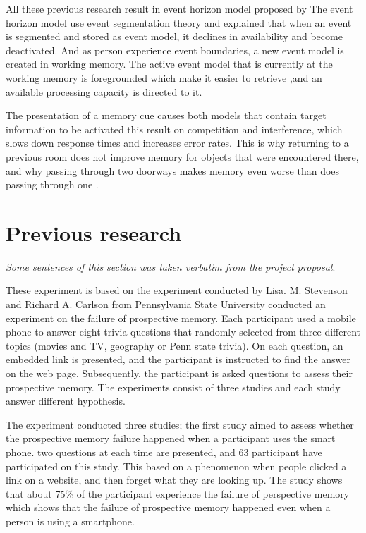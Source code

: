 All these previous research result in event horizon model proposed by \cite{Radvansky2012}
The event horizon model use event segmentation theory and explained that when an event is
segmented and stored as event model, it declines in availability and become deactivated. And
as person experience event boundaries, a new event model is created in working memory. The
active event model that is currently at the working memory is foregrounded which make it easier
to retrieve ,and an available processing capacity is directed to it.

The presentation of a memory cue causes both models that contain target information to
be activated this result on competition and interference, which slows down response times and
increases error rates. This is why returning to a previous room does not improve memory for
objects that were encountered there, and why passing through two doorways makes memory even
worse than does passing through one \citep{Radvansky2011}.


\section{Previous research}
\textit{Some sentences of this section was taken verbatim from the project proposal}.

These experiment is based on the experiment conducted by Lisa. M. Stevenson and Richard A. Carlson from Pennsylvania State University conducted an
experiment on the failure of prospective memory.
Each participant used a mobile phone to answer eight trivia questions that randomly selected from three different topics (movies and TV, geography or Penn state trivia). On each question,
an embedded link is presented, and the participant is instructed to find the answer on the web page. Subsequently, the participant is asked questions to assess their prospective memory. The experiments consist of three studies and each study
answer different hypothesis.

The experiment conducted three studies;
the first study aimed to assess whether the prospective memory failure happened when
a participant uses the smart phone. two questions at each time are presented, and 63 participant have participated on this study.
This based on a phenomenon when people clicked a link on a website, and then forget what they are looking up. The study shows that about 75\% of the
participant experience the failure of perspective memory which shows that the failure of prospective memory happened even when a person is using a smartphone.

